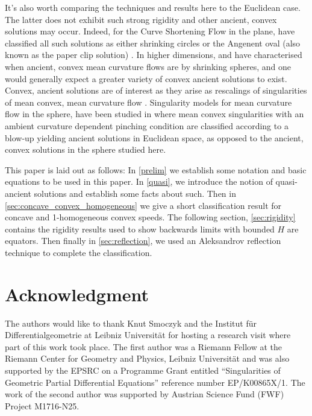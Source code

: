 \documentclass{amsart}
\begin{document}
It's also worth comparing the techniques and results here to the Euclidean case. The latter does not exhibit such strong rigidity and other ancient, convex solutions may occur. Indeed, for the Curve Shortening Flow in the plane, \cite{DaskalopoulosHamiltonSesum:2010} have classified all such solutions as either shrinking circles or the Angenent oval (also known as the paper clip solution) \cite{Angenent:1992}. In higher dimensions, \cite{HuiskenSinestrari:05/2014} and \cite{HaslhoferHershkovits:08/2013} have characterised when ancient, convex mean curvature flows are by shrinking spheres, and one would generally expect a greater variety of convex ancient solutions to exist. Convex, ancient solutions are of interest as they arise as rescalings of singularities \cite{HuiskenSinestrari:01/1999} of mean convex, mean curvature flow \cite{HuiskenSinestrari:09/1999, White:10/2002}. Singularity models for mean curvature flow in the sphere, have been studied in \cite{Nguyen:2015} where mean convex singularities with an ambient curvature dependent pinching condition are classified according to a blow-up yielding ancient solutions in Euclidean space, as opposed to the ancient, convex solutions in the sphere studied here.

This paper is laid out as follows: In \cref{prelim} we establish some notation and basic equations to be used in this paper. In \cref{quasi}, we introduce the notion of quasi-ancient solutions and establish some facts about such. Then in \cref{sec:concave_convex_homogeneous} we give a short classification result for concave and 1-homogeneous convex speeds. The following section, \cref{sec:rigidity} contains the rigidity results used to show backwards limits with bounded \(H\) are equators. Then finally in \cref{sec:reflection}, we used an Aleksandrov reflection technique to complete the classification.

\section*{Acknowledgment}

The authors would like to thank Knut Smoczyk and the Institut f\"{u}r Differentialgeometrie at Leibniz Universität for hosting a research visit where part of this work took place. The first author was a Riemann Fellow at the Riemann Center for Geometry and Physics, Leibniz Universit\"{a}t and was also supported by the EPSRC on a Programme Grant entitled ``Singularities of Geometric Partial Differential Equations'' reference number EP/K00865X/1. The work of the second author was supported by Austrian Science Fund (FWF) Project M1716-N25.
\end{document}
